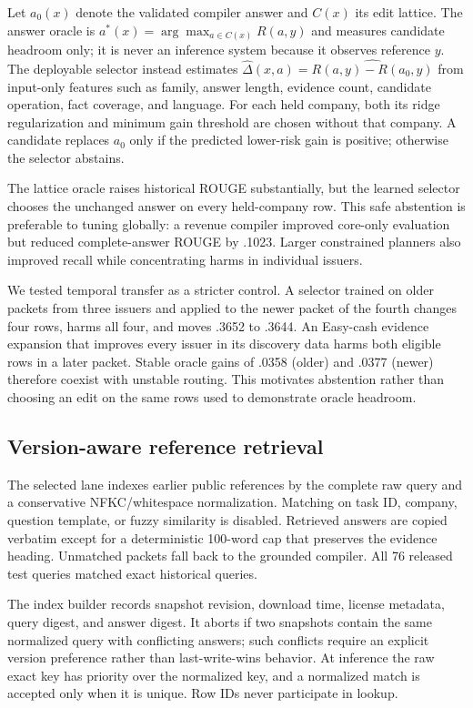 \documentclass[11pt]{article}
\begin{document}
Let $a_0(x)$ denote the validated compiler answer and $C(x)$ its edit lattice.
The answer oracle is $a^*(x)=\arg\max_{a\in C(x)}R(a,y)$ and measures candidate
headroom only; it is never an inference system because it observes reference
$y$.  The deployable selector instead estimates
$\widehat{\Delta}(x,a)=\widehat{R(a,y)-R(a_0,y)}$ from input-only features such
as family, answer length, evidence count, candidate operation, fact coverage,
and language.  For each held company, both its ridge regularization and minimum
gain threshold are chosen without that company.  A candidate replaces $a_0$
only if the predicted lower-risk gain is positive; otherwise the selector
abstains.

The lattice oracle raises historical ROUGE substantially, but the learned selector chooses the unchanged answer on every held-company row. This safe abstention is preferable to tuning globally: a revenue compiler improved core-only evaluation but reduced complete-answer ROUGE by .1023. Larger constrained planners also improved recall while concentrating harms in individual issuers.

We tested temporal transfer as a stricter control.  A selector trained on older
packets from three issuers and applied to the newer packet of the fourth changes
four rows, harms all four, and moves .3652 to .3644.  An Easy-cash evidence
expansion that improves every issuer in its discovery data harms both eligible
rows in a later packet.  Stable oracle gains of .0358 (older) and .0377 (newer)
therefore coexist with unstable routing.  This motivates abstention rather than
choosing an edit on the same rows used to demonstrate oracle headroom.

\subsection{Version-aware reference retrieval}
The selected lane indexes earlier public references by the complete raw query and a conservative NFKC/whitespace normalization. Matching on task ID, company, question template, or fuzzy similarity is disabled. Retrieved answers are copied verbatim except for a deterministic 100-word cap that preserves the evidence heading. Unmatched packets fall back to the grounded compiler. All 76 released test queries matched exact historical queries.

The index builder records snapshot revision, download time, license metadata,
query digest, and answer digest.  It aborts if two snapshots contain the same
normalized query with conflicting answers; such conflicts require an explicit
version preference rather than last-write-wins behavior.  At inference the raw
exact key has priority over the normalized key, and a normalized match is
accepted only when it is unique.  Row IDs never participate in lookup.
\end{document}
